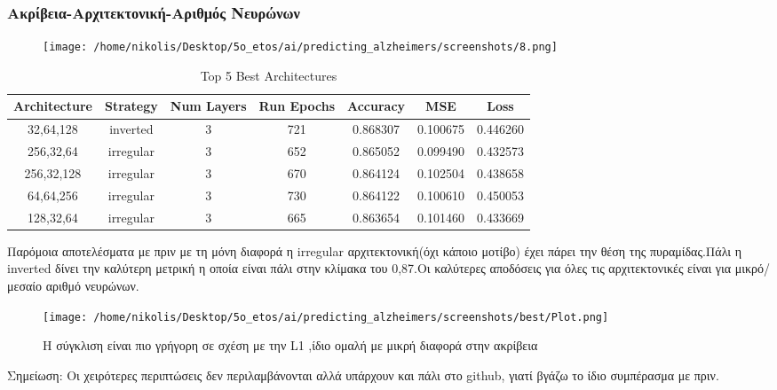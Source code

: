 \documentclass[a4paper,11pt]{article}
\begin{document}
\subsubsection{Ακρίβεια-Αρχιτεκτονική-Αριθμός Νευρώνων}

\begin{figure}[H]
    \centering
    \texttt{[image: /home/nikolis/Desktop/5o\_etos/ai/predicting\_alzheimers/screenshots/8.png]}
    \label{fig:double}
\end{figure}

\begin{table}[h!]
    \centering
    \caption{Top 5 Best Architectures}
    \label{tab:best-architectures}
    \begin{tabular}{c c c c c c c}
    \hline
    \textbf{Architecture} & \textbf{Strategy} & \textbf{Num Layers} & \textbf{Run Epochs} & \textbf{Accuracy} & \textbf{MSE} & \textbf{Loss} \\
    \hline
    32,64,128   & inverted  & 3 & 721 & 0.868307 & 0.100675 & 0.446260 \\
    256,32,64   & irregular & 3 & 652 & 0.865052 & 0.099490 & 0.432573 \\
    256,32,128  & irregular & 3 & 670 & 0.864124 & 0.102504 & 0.438658 \\
    64,64,256   & irregular & 3 & 730 & 0.864122 & 0.100610 & 0.450053 \\
    128,32,64   & irregular & 3 & 665 & 0.863654 & 0.101460 & 0.433669 \\
    \hline
    \end{tabular}
    \end{table}
Παρόμοια αποτελέσματα με πριν με τη μόνη διαφορά η irregular αρχιτεκτονική(όχι κάποιο μοτίβο) έχει πάρει την θέση της πυραμίδας.Πάλι η inverted 
δίνει την καλύτερη μετρική η οποία είναι πάλι στην κλίμακα του 0,87.Οι καλύτερες αποδόσεις για όλες τις αρχιτεκτονικές είναι για μικρό/μεσαίο αριθμό νευρώνων.

\begin{figure}[H]
    \centering
    \texttt{[image: /home/nikolis/Desktop/5o\_etos/ai/predicting\_alzheimers/screenshots/best/Plot.png]}
    \label{fig:double}
    \caption{Η σύγκλιση είναι πιο γρήγορη σε σχέση με την L1 ,ίδιο ομαλή με μικρή διαφορά στην ακρίβεια}
\end{figure} 

Σημείωση: Οι χειρότερες περιπτώσεις δεν περιλαμβάνονται αλλά υπάρχουν και πάλι στο github, γιατί βγάζω το ίδιο συμπέρασμα με πριν.
\end{document}
